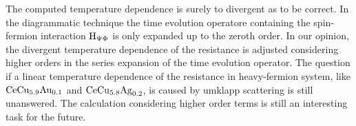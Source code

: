 The computed temperature dependence is surely to divergent as to be correct.
In the diagrammatic technique the time evolution operatore containing the spin-fermion interaction $\mathrm{H}_{\Psi\Phi}$ is only expanded up to the zeroth order.
In our opinion, the divergent temperature dependence of the resistance is adjusted considering higher orders in the series expansion of the time evolution operator.
The question if a linear temperature dependence of the resistance in heavy-fermion system, like $\mathrm{CeCu}_{5.9}\mathrm{Au}_{0.1}$ and $\mathrm{CeCu}_{5.8}\mathrm{Ag}_{0.2}$, is caused by umklapp scattering is still unanswered.
The calculation considering higher order terms is still an interesting task for the future.














